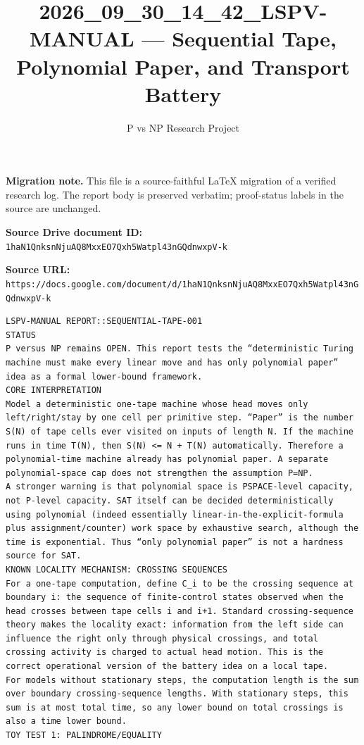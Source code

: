 \documentclass[11pt]{article}
\title{2026\_09\_30\_14\_42\_LSPV-MANUAL — Sequential Tape, Polynomial Paper, and Transport Battery}
\author{P vs NP Research Project}
\date{}
\begin{document}
\maketitle

\noindent\textbf{Migration note.} This file is a source-faithful LaTeX migration of a verified research log. The report body is preserved verbatim; proof-status labels in the source are unchanged.

\noindent\textbf{Source Drive document ID:} \texttt{1haN1QnksnNjuAQ8MxxEO7Qxh5Watpl43nGQdnwxpV-k}

\noindent\textbf{Source URL:} \texttt{https://docs.google.com/document/d/1haN1QnksnNjuAQ8MxxEO7Qxh5Watpl43nGQdnwxpV-k}

\bigskip
\begin{Verbatim}[breaklines=true,breakanywhere=true]
LSPV-MANUAL REPORT::SEQUENTIAL-TAPE-001
STATUS
P versus NP remains OPEN. This report tests the “deterministic Turing machine must make every linear move and has only polynomial paper” idea as a formal lower-bound framework.
CORE INTERPRETATION
Model a deterministic one-tape machine whose head moves only left/right/stay by one cell per primitive step. “Paper” is the number S(N) of tape cells ever visited on inputs of length N. If the machine runs in time T(N), then S(N) <= N + T(N) automatically. Therefore a polynomial-time machine already has polynomial paper. A separate polynomial-space cap does not strengthen the assumption P=NP.
A stronger warning is that polynomial space is PSPACE-level capacity, not P-level capacity. SAT itself can be decided deterministically using polynomial (indeed essentially linear-in-the-explicit-formula plus assignment/counter) work space by exhaustive search, although the time is exponential. Thus “only polynomial paper” is not a hardness source for SAT.
KNOWN LOCALITY MECHANISM: CROSSING SEQUENCES
For a one-tape computation, define C_i to be the crossing sequence at boundary i: the sequence of finite-control states observed when the head crosses between tape cells i and i+1. Standard crossing-sequence theory makes the locality exact: information from the left side can influence the right only through physical crossings, and total crossing activity is charged to actual head motion. This is the correct operational version of the battery idea on a local tape.
For models without stationary steps, the computation length is the sum over boundary crossing-sequence lengths. With stationary steps, this sum is at most total time, so any lower bound on total crossings is also a time lower bound.
TOY TEST 1: PALINDROME/EQUALITY

\end{Verbatim}
\end{document}
